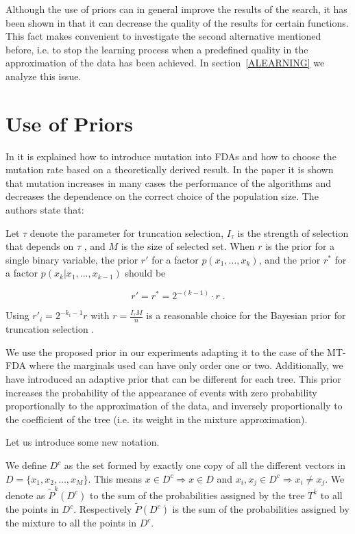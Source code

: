 \documentclass[runningheads]{llncs}
\begin{document}
Although the use of priors can in general improve  the results of the search, it
has  been shown in \cite{Mahnig_and_Muehlenbein:2001a} that it can decrease
the quality of the results for certain functions. This fact makes convenient to
investigate the second alternative mentioned before, i.e. to stop the learning process when a predefined quality in the approximation
     of the data has been achieved. In section~\ref{ALEARNING} we analyze this issue.

\section{Use of Priors}\label{PRIORS}

 In
\cite{Mahnig_and_Muehlenbein:2001a} it is explained how to introduce mutation into
FDAs and how to choose the mutation rate based on a theoretically derived
result.  In
the paper it is shown that mutation increases in many cases the performance of the
algorithms and decreases the dependence on the correct choice of the population
size.  The authors state that:

Let $\tau$ denote the parameter for truncation selection, $I_{\tau}$ is the
strength of selection that depends on $\tau$ \cite{Muhlenbein:1997}, and $M$ is
the size of selected set. When $r$ is the prior for a single binary variable, the prior $r'$ for a factor
$p(x_1,\ldots, x_k)$, and the prior $r^*$ for a factor $p(x_k|x_1,...,x_{k-1})$ should be

\begin{equation}
   r'=r^*=2^{-(k-1)}\cdot r \;. 
 \label{GENPRIOR} 
\end{equation}
 
Using $r'_i=2^{-k_i-1}r$ with $r=\frac{I_{\tau}M}{n}$ is a reasonable choice for the
  Bayesian prior for truncation selection
  \cite{Mahnig_and_Muehlenbein:2001a}. 


We
  use the proposed prior in our experiments adapting it to the case of the MT-FDA
  where the marginals used can have only order one or two. Additionally, we have introduced
  an adaptive prior that can be different for each tree. This prior increases the probability of the appearance of events with
  zero probability proportionally to the approximation of the data, and inversely 
proportionally to the coefficient of the tree (i.e. its weight in the mixture
  approximation). 

 Let us introduce some new notation.

We define $D^c$ as the set formed by exactly one copy of all the different vectors in
$D=\{x_1,x_2,\ldots,x_M \}$. This means $x \in  D^c \Longrightarrow x \in  D$ and $x_i,x_j \in D^c
\Longrightarrow x_i \neq x_j$. We denote as
${\tilde{P}}^k(D^c)$ to the sum of the probabilities assigned by the tree $T^k$ to all the
points in $D^c$. Respectively ${\tilde{P}}(D^c)$ is the sum of the probabilities assigned
by the mixture to all the points in  $D^c$.
\end{document}
